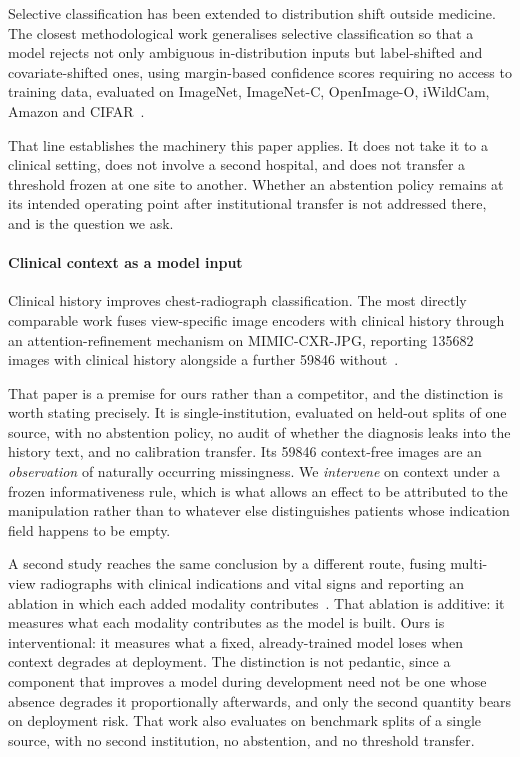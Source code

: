 Selective classification has been extended to distribution shift outside
medicine. The closest methodological work generalises selective classification
so that a model rejects not only ambiguous in-distribution inputs but
label-shifted and covariate-shifted ones, using margin-based confidence scores
requiring no access to training data, evaluated on ImageNet, ImageNet-C,
OpenImage-O, iWildCam, Amazon and CIFAR~\cite{selective_shift_2025}.

That line establishes the machinery this paper applies. It does not take it to a
clinical setting, does not involve a second hospital, and does not transfer a
threshold frozen at one site to another. Whether an abstention policy remains at
its intended operating point after institutional transfer is not addressed
there, and is the question we ask.

\paragraph{Clinical context as a model input}
\label{sec:rw-context}

Clinical history improves chest-radiograph classification. The most directly
comparable work fuses view-specific image encoders with clinical history through
an attention-refinement mechanism on MIMIC-CXR-JPG, reporting
\num{135682} images with clinical history alongside a further \num{59846}
without~\cite{yang2025mcxnet}.

That paper is a premise for ours rather than a competitor, and the distinction
is worth stating precisely. It is single-institution, evaluated on held-out
splits of one source, with no abstention policy, no audit of whether the
diagnosis leaks into the history text, and no calibration transfer. Its
\num{59846} context-free images are an \emph{observation} of naturally occurring
missingness. We \emph{intervene} on context under a frozen informativeness rule,
which is what allows an effect to be attributed to the manipulation rather than
to whatever else distinguishes patients whose indication field happens to be
empty.

A second study reaches the same conclusion by a different route, fusing
multi-view radiographs with clinical indications and vital signs and reporting
an ablation in which each added modality
contributes~\cite{sloan2025clinically}. That ablation is additive: it measures
what each modality contributes as the model is built. Ours is interventional: it
measures what a fixed, already-trained model loses when context degrades at
deployment. The distinction is not pedantic, since a component that improves a
model during development need not be one whose absence degrades it
proportionally afterwards, and only the second quantity bears on deployment
risk. That work also evaluates on benchmark splits of a single source, with no
second institution, no abstention, and no threshold transfer.


